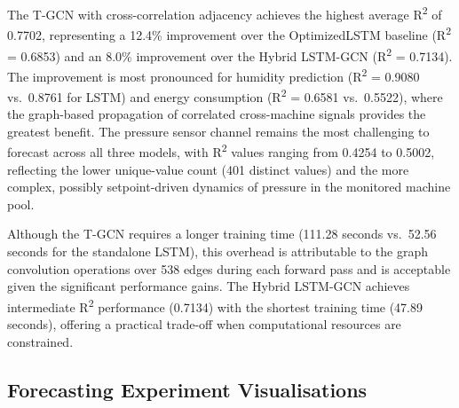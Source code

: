 The T-GCN with cross-correlation adjacency achieves the highest average R\textsuperscript{2} of 0.7702, representing a 12.4\% improvement over the OptimizedLSTM baseline (R\textsuperscript{2} = 0.6853) and an 8.0\% improvement over the Hybrid LSTM-GCN (R\textsuperscript{2} = 0.7134). The improvement is most pronounced for humidity prediction (R\textsuperscript{2} = 0.9080 vs.\ 0.8761 for LSTM) and energy consumption (R\textsuperscript{2} = 0.6581 vs.\ 0.5522), where the graph-based propagation of correlated cross-machine signals provides the greatest benefit. The pressure sensor channel remains the most challenging to forecast across all three models, with R\textsuperscript{2} values ranging from 0.4254 to 0.5002, reflecting the lower unique-value count (401 distinct values) and the more complex, possibly setpoint-driven dynamics of pressure in the monitored machine pool.

Although the T-GCN requires a longer training time (111.28 seconds vs.\ 52.56 seconds for the standalone LSTM), this overhead is attributable to the graph convolution operations over 538 edges during each forward pass and is acceptable given the significant performance gains. The Hybrid LSTM-GCN achieves intermediate R\textsuperscript{2} performance (0.7134) with the shortest training time (47.89 seconds), offering a practical trade-off when computational resources are constrained.

\subsection{Forecasting Experiment Visualisations}


